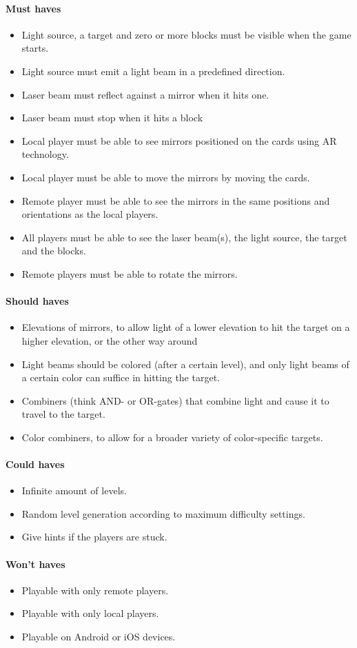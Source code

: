 \paragraph{Must haves}
\begin{itemize}
	\item Light source, a target and zero or more blocks must be visible when the game starts.
	\item Light source must emit a light beam in a predefined direction.
	\item Laser beam must reflect against a mirror when it hits one.
	\item Laser beam must stop when it hits a block
	\item Local player must be able to see mirrors positioned on the cards using AR technology.
	\item Local player must be able to move the mirrors by moving the cards.
	\item Remote player must be able to see the mirrors in the same positions and 
		  orientations as the local players.
	\item All players must be able to see the laser beam(s), the light source, the target and the blocks.
	\item Remote players must be able to rotate the mirrors.
\end{itemize}

\paragraph{Should haves}
\begin{itemize}
	\item Elevations of mirrors, to allow light of a lower elevation to hit the target on a higher elevation, or the other way around
	\item Light beams should be colored (after a certain level), and only light beams of a certain color can suffice in hitting the target.
	\item Combiners (think AND- or OR-gates) that combine light and cause it to travel to the target.
	\item Color combiners, to allow for a broader variety of color-specific targets.
\end{itemize}

\paragraph{Could haves}
\begin{itemize}
	\item Infinite amount of levels.
	\item Random level generation according to maximum difficulty settings.
	\item Give hints if the players are stuck.
\end{itemize}

\paragraph{Won't haves}
\begin{itemize}
	\item Playable with only remote players.
	\item Playable with only local players.
	\item Playable on Android or iOS devices.
\end{itemize}
